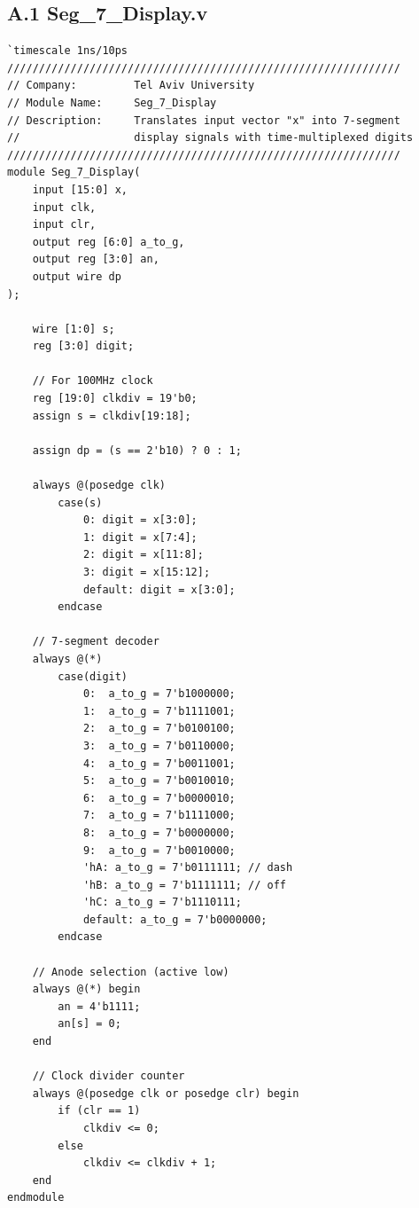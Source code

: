 \documentclass[12pt,a4paper]{article}
\begin{document}
\subsection*{A.1 Seg\_7\_Display.v}
\begin{lstlisting}[style=verilog]
`timescale 1ns/10ps
//////////////////////////////////////////////////////////////
// Company:         Tel Aviv University
// Module Name:     Seg_7_Display
// Description:     Translates input vector "x" into 7-segment
//                  display signals with time-multiplexed digits
//////////////////////////////////////////////////////////////
module Seg_7_Display(
    input [15:0] x,
    input clk,
    input clr,
    output reg [6:0] a_to_g,
    output reg [3:0] an,
    output wire dp
);

    wire [1:0] s;
    reg [3:0] digit;

    // For 100MHz clock
    reg [19:0] clkdiv = 19'b0;
    assign s = clkdiv[19:18];

    assign dp = (s == 2'b10) ? 0 : 1;

    always @(posedge clk)
        case(s)
            0: digit = x[3:0];
            1: digit = x[7:4];
            2: digit = x[11:8];
            3: digit = x[15:12];
            default: digit = x[3:0];
        endcase

    // 7-segment decoder
    always @(*)
        case(digit)
            0:  a_to_g = 7'b1000000;
            1:  a_to_g = 7'b1111001;
            2:  a_to_g = 7'b0100100;
            3:  a_to_g = 7'b0110000;
            4:  a_to_g = 7'b0011001;
            5:  a_to_g = 7'b0010010;
            6:  a_to_g = 7'b0000010;
            7:  a_to_g = 7'b1111000;
            8:  a_to_g = 7'b0000000;
            9:  a_to_g = 7'b0010000;
            'hA: a_to_g = 7'b0111111; // dash
            'hB: a_to_g = 7'b1111111; // off
            'hC: a_to_g = 7'b1110111;
            default: a_to_g = 7'b0000000;
        endcase

    // Anode selection (active low)
    always @(*) begin
        an = 4'b1111;
        an[s] = 0;
    end

    // Clock divider counter
    always @(posedge clk or posedge clr) begin
        if (clr == 1)
            clkdiv <= 0;
        else
            clkdiv <= clkdiv + 1;
    end
endmodule
\end{lstlisting}

\newpage
\end{document}
